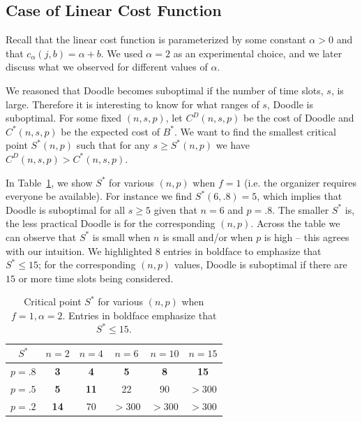 
\subsection{Case of Linear Cost Function} \label{bdoodle:sec:result_linear_cost}
Recall that the linear cost function is parameterized by some constant $\alpha>0$ and that $c_{\alpha}(j, b) = \alpha + b$. We used $\alpha = 2$ as an experimental choice, and we later discuss what we observed for different values of $\alpha$.

We reasoned that Doodle becomes suboptimal if the number of time slots, $s$, is large. Therefore it is interesting to know for what ranges of $s$, Doodle is suboptimal. For some fixed $(n, s, p)$, let $C^D(n, s, p)$ be the cost of Doodle and $C^*(n, s, p)$ be the expected cost of $B^*$. We want to find the smallest critical point $S^*(n, p)$ such that for any $s \geq S^*(n, p)$ we have $C^D(n, s, p) > C^*(n, s, p)$. 

In Table~\ref{bdoodle:table:DoodleSuboptimal}, we show $S^*$ for various $(n, p)$ when $f = 1$ (i.e. the organizer requires everyone be available). For instance we find $S^*(6, .8) = 5$, which implies that Doodle is suboptimal for all $s \geq 5$ given that $n=6$ and $p=.8$. The smaller $S^*$ is, the less practical Doodle is for the corresponding $(n, p)$. 
Across the table we can observe that $S^*$ is small when $n$ is small and/or when $p$ is high -- this agrees with our intuition.  
We highlighted $8$ entries in boldface to emphasize that $S^* \leq 15$; for the corresponding $(n, p)$ values, Doodle is suboptimal if there are $15$ or more time slots being considered.
\begin{table}[h!]  %
\centering
\begin{tabular}{|c|c|c|c|c|c|}
	\hline
	$S^*$ & $n = 2$ & $n = 4$ & $n = 6$ & $ n = 10 $ & $n = 15$ \\ \hline
	$p = .8$ & \textbf{3} & \textbf{4} & \textbf{5} & \textbf{8} & \textbf{15} \\ \hline
	$p = .5$ & \textbf{5} & \textbf{11} & 22 & 90 & $>300$\\ \hline
	$p = .2$ & \textbf{14} & 70 & $>300$ & $>300$ & $>300$ \\ \hline	
\end{tabular}
\caption{Critical point $S^*$ for various $(n, p)$ when $f = 1, \alpha = 2$.
Entries in boldface emphasize that $S^* \leq 15$.
} \label{bdoodle:table:DoodleSuboptimal}
\end{table}

